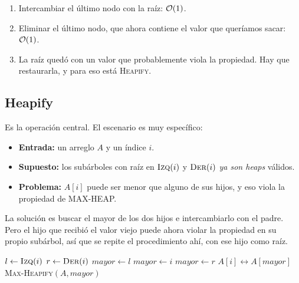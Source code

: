 \documentclass[11pt,letterpaper]{article}
\begin{document}
\begin{enumerate}[itemsep=0.2em]
  \item Intercambiar el último nodo con la raíz: $\mathcal{O}\!\left(1\right)$.
  \item Eliminar el último nodo, que ahora contiene el valor que
        queríamos sacar: $\mathcal{O}\!\left(1\right)$.
  \item La raíz quedó con un valor que probablemente viola la
        propiedad. Hay que restaurarla, y para eso está
        \textsc{Heapify}.
\end{enumerate}


\subsection*{Heapify}

Es la operación central. El escenario es muy específico:

\begin{itemize}[itemsep=0.2em]
  \item \textbf{Entrada:} un arreglo $A$ y un índice $i$.
  \item \textbf{Supuesto:} los subárboles con raíz en
        $\textsc{Izq}(i)$ y $\textsc{Der}(i)$ \emph{ya son heaps}
        válidos.
  \item \textbf{Problema:} $A[i]$ puede ser menor que alguno de sus
        hijos, y eso viola la propiedad de MAX-HEAP.
\end{itemize}

La solución es buscar el mayor de los dos hijos e intercambiarlo con
el padre. Pero el hijo que recibió el valor viejo puede ahora violar
la propiedad en su propio subárbol, así que se repite el
procedimiento ahí, con ese hijo como raíz.

\begin{algorithm}[H]
\caption{\textsc{Max-Heapify}$(A, i)$}
\begin{algorithmic}[1]
\State $l \gets \textsc{Izq}(i)$
\State $r \gets \textsc{Der}(i)$
  \State $\mathit{mayor} \gets l$
\Else
  \State $\mathit{mayor} \gets i$
\EndIf
{}
  \State $\mathit{mayor} \gets r$
\EndIf
{}
  \State \Intercambiar $A[i] \leftrightarrow A[\mathit{mayor}]$
  \State \textsc{Max-Heapify}$(A, \mathit{mayor})$
\EndIf
\end{algorithmic}
\end{algorithm}
\end{document}
